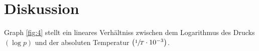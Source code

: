 \section{Diskussion}

\justifying Graph \ref{fig:4} stellt ein lineares Verhältniss zwischen dem Logarithmus des Drucks $\left( \log{p} \right)$ und 
der absoluten Temperatur $\left( \sfrac{1}{T} \cdot 10^{-3} \right)$.


\newpage
\printbibliography


